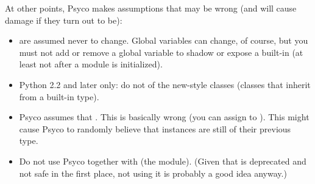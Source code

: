 \documentclass{manual}
\begin{document}
At other points, Psyco makes assumptions that may be wrong (and will cause damage if they turn out to be):
%
%
\begin{itemize}
  
\item {} are assumed never to change.  Global variables can change, of course, but you must not add or remove a global variable to shadow or expose a built-in (at least not after a module is initialized).

\item Python 2.2 and later only: do not  of the new-style classes (classes that inherit from a built-in type).

\item Psyco assumes that .  This is basically wrong (you can assign to ).  This might cause Psyco to randomly believe that instances are still of their previous type.

\item Do not use Psyco together with  (the  module).  (Given that  is deprecated and not safe in the first place, not using it is probably a good idea anyway.)

\end{itemize}
\end{document}
